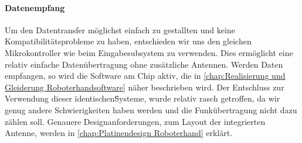 \documentclass[titlepage,12pt,twoside]{article}
\begin{document}
\paragraph{Datenempfang}
\hfill \break
\hfill \break
Um den Datentransfer möglichst einfach zu gestallten und keine Kompatibilitätsprobleme zu haben, entschieden wir uns den gleichen Mikrokontroller
wie beim Eingabesubsystem zu verwenden. Dies ermöglicht eine relativ einfache Datenübertragung ohne zusätzliche Antennen. Werden Daten empfangen,
so wird die Software am Chip aktiv, die in \autoref{chap:Realisierung und Gleiderung Roboterhandsoftware} näher beschrieben wird. Der
Entschluss zur Verwendung dieser \"identischen\" Systeme, wurde relativ rasch getroffen, da wir genug andere Schwierigkeiten haben werden und 
die Funkübertragung nicht dazu zählen soll. Genauere Designanforderungen, zum Layout der integrierten Antenne, werden in \autoref{chap:Platinendesign Roboterhand} erklärt.
\end{document}
